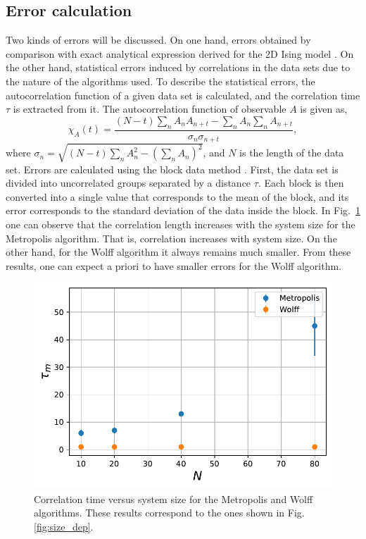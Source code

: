 \documentclass[pra,aps,superscriptaddress,amssymb,amsmath,reprint,noeprint,floatfix]{revtex4-2}
\begin{document}
\subsection{\label{subse:errors}Error calculation}
Two kinds of errors will be discussed. On one hand, errors obtained by comparison with exact analytical expression derived for the 2D Ising model \cite{PhysRev.65.117}. On the other hand, statistical errors induced by correlations in the data sets due to the nature of the algorithms used. To describe the statistical errors, the autocorrelation function of a given data set is calculated, and the correlation time $\tau$ is extracted from it. The autocorrelation function of observable $A$ is given as,
\begin{equation}
    \chi_A(t) = \frac{(N-t)\sum_n A_nA_{n+t}-\sum_nA_n\sum_nA_{n+t}}{\sigma_n\sigma_{n+t}},
\end{equation}
where $\sigma_n = \sqrt{(N-t)\sum_nA_n^2-(\sum_nA_n)^2}$, and $N$ is the length of the data set. Errors are calculated using the block data method \cite{newman1999monte}. First, the data set is divided into uncorrelated groups separated by a distance $\tau$. Each block is then converted into a single value that corresponds to the mean of the block, and its error corresponds to the standard deviation of the data inside the block. In Fig.\ \ref{fig:taus} one can observe that the correlation length increases with the system size for the Metropolis algorithm. That is, correlation increases with system size. On the other hand, for the Wolff algorithm it always remains much smaller. From these results, one can expect a priori to have smaller errors for the Wolff algorithm.
\begin{figure}[H]
    \centering
    \includegraphics[width=0.8\linewidth]{Figures/taus_m.pdf}
    \caption{Correlation time versus system size for the Metropolis and Wolff algorithms. These results correspond to the ones shown in Fig. \ref{fig:size_dep}.}
    \label{fig:taus}
\end{figure}
\end{document}
